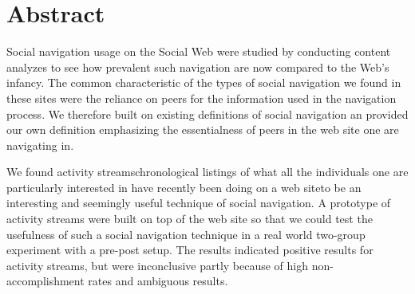 \chapter{Abstract}

Social navigation usage on the Social Web were studied by conducting content
analyzes to see how prevalent such navigation are now compared to the Web's
infancy. The common characteristic of the types of social navigation we found
in these sites were the reliance on peers for the information used in the
navigation process. We therefore built on existing definitions of social
navigation an provided our own definition emphasizing the essentialness of
peers in the web site one are navigating in.

We found activity streams\dash{}chronological listings of what
all the individuals one are particularly interested in have recently been
doing on a web site\dash{}to be an interesting and seemingly useful technique
of social navigation. A prototype of activity streams were built on top of the
\urort{} web site so that we could test the usefulness of such a social
navigation technique in a real world two-group experiment with a pre-post
setup. The results indicated positive results for activity streams, but were
inconclusive partly because of high non-accomplishment
rates and ambiguous results.
